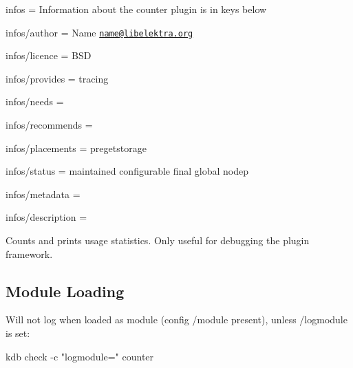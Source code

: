 
\begin{DoxyItemize}
\item infos = Information about the counter plugin is in keys below
\item infos/author = Name \href{mailto:name@libelektra.org}{\tt name@libelektra.\+org}
\item infos/licence = B\+S\+D
\item infos/provides = tracing
\item infos/needs =
\item infos/recommends =
\item infos/placements = pregetstorage
\item infos/status = maintained configurable final global nodep
\item infos/metadata =
\item infos/description =
\end{DoxyItemize}

Counts and prints usage statistics. Only useful for debugging the plugin framework.

\subsection*{Module Loading}

Will not log when loaded as module (config {\ttfamily /module} present), unless {\ttfamily /logmodule} is set\+: \begin{DoxyVerb}kdb check -c "logmodule=" counter\end{DoxyVerb}
 